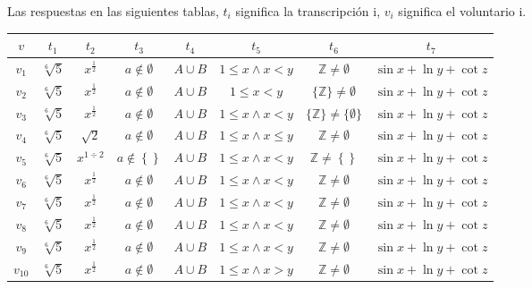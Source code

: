 Las respuestas en las siguientes tablas, $t_i$ significa la transcripción i, $v_i$ significa el voluntario i.

\begin{center}
\begin{tabular}{ |c|c|c|c|c|c|c|c| }
 \hline
    $v$ & $t_1$ & $t_2$ & $t_3$ & $t_4$ & $t_5$ & $t_6$ & $t_7$ \\[0.5ex]
    \hline\hline
    $v_1$ & $ \sqrt[6]{5}$ & $x^\frac{1}{2}$ & $a \not\in \emptyset$          & $A \cup B$ & $1\leq x \wedge x < y$    & $\mathbb{Z} \neq \emptyset$            & $\sin x + \ln y + \cot z$  \\
    $v_2$ &$ \sqrt[6]{5}$ & $x^\frac{1}{2}$ & $a \not\in \emptyset$          & $A \cup B$ & $1\leq x < y$             & $\{ \mathbb{Z} \} \neq \emptyset$      & $\sin x + \ln y + \cot z$  \\
    $v_3$ &$ \sqrt[6]{5}$ & $x^\frac{1}{2}$ & $a \not\in \emptyset$          & $A \cup B$ & $1\leq x \wedge x < y$    & $\{ \mathbb{Z} \} \neq \{\emptyset\}$  & $\sin x + \ln y + \cot z$  \\
    $v_4$ &$ \sqrt[6]{5}$ & $ \sqrt{2}$     & $a \not\in \emptyset$          & $A \cup B$ & $1\leq x \wedge x \leq y$ & $\mathbb{Z} \neq \emptyset$            & $\sin x + \ln y + \cot z$  \\
    $v_5$ &$ \sqrt[6]{5}$ & $x^{1 \div 2}$  & $a \not\in \left \{ \right \}$ & $A \cup B$ & $1\leq x \wedge x < y$    & $\mathbb{Z} \neq \left \{ \right \}$   & $\sin x + \ln y + \cot z$  \\
    $v_6$ &$ \sqrt[6]{5}$ & $x^\frac{1}{2}$ & $a \not\in \emptyset$          & $A \cup B$ & $1\leq x \wedge x < y$    & $\mathbb{Z} \neq \emptyset$            & $\sin x + \ln y + \cot z$  \\
    $v_7$ &$ \sqrt[6]{5}$ & $x^\frac{1}{2}$ & $a \not\in \emptyset$          & $A \cup B$ & $1\leq x \wedge x < y$    & $\mathbb{Z} \neq \emptyset$            & $\sin x + \ln y + \cot z$  \\
    $v_8$ &$ \sqrt[6]{5}$ & $x^\frac{1}{2}$ & $a \not\in \emptyset$          & $A \cup B$ & $1\leq x \wedge x < y$    & $\mathbb{Z} \neq \emptyset$            & $\sin x + \ln y + \cot z$  \\
    $v_9$ &$ \sqrt[6]{5}$ & $x^\frac{1}{2}$ & $a \not\in \emptyset$          & $A \cup B$ & $1\leq x \wedge x < y$    & $\mathbb{Z} \neq \emptyset$            & $\sin x + \ln y + \cot z$  \\
    $v_{10}$ &$ \sqrt[6]{5}$ & $x^\frac{1}{2}$ & $a \not\in \emptyset$          & $A \cup B$ & $1\leq x \wedge x > y$    & $\mathbb{Z} \neq \emptyset$            & $\sin x + \ln y + \cot z$  \\

\end{tabular}
\end{center}
